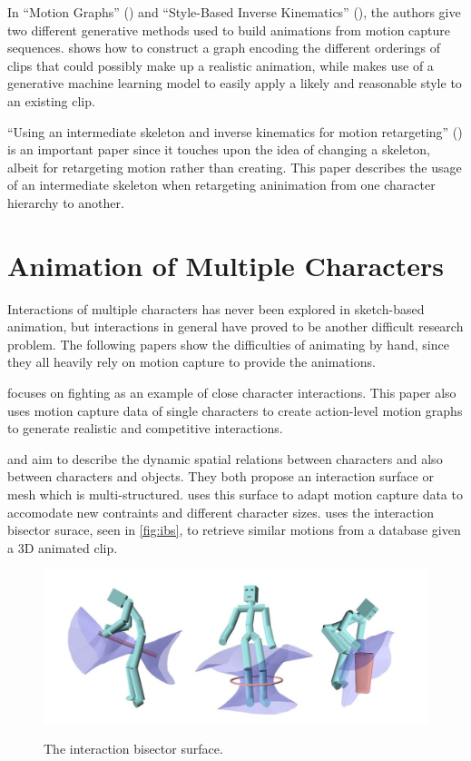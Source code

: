 In ``Motion Graphs'' (\citep{kovar2002motion}) and ``Style-Based Inverse Kinematics'' (\citep{grochow2004style}), the authors give two different generative methods used to build animations from motion capture sequences. \citep{kovar2002motion} shows how to construct a graph encoding the different orderings of clips that could possibly make up a realistic animation, while \citep{grochow2004style} makes use of a generative machine learning model to easily apply a likely and reasonable style to an existing clip.

``Using an intermediate skeleton and inverse kinematics for motion retargeting'' (\citep{monzani2000using}) is an important paper since it touches upon the idea of changing a skeleton, albeit for retargeting motion rather than creating. This paper describes the usage of an intermediate skeleton when retargeting aninimation from one character hierarchy to another.

\section{Animation of Multiple Characters}
Interactions of multiple characters has never been explored in sketch-based animation, but interactions in general have proved to be another difficult research problem. The following papers show the difficulties of animating by hand, since they all heavily rely on motion capture to provide the animations.

\citep{shum2007simulating} focuses on fighting as an example of close character interactions. This paper also uses motion capture data of single characters to create action-level motion graphs to generate realistic and competitive interactions.
  
\citep{ho2014multi} and \citep{zhao2017character} aim to describe the dynamic spatial relations between characters and also between characters and objects. They both propose an interaction surface or mesh which is multi-structured. \citep{ho2014multi} uses this surface to adapt motion capture data to accomodate new contraints and different character sizes. \citep{zhao2017character} uses the interaction bisector surace, seen in \autoref{fig:ibs}, to retrieve similar motions from a database given a 3D animated clip.

\begin{figure}[!h]
\centering
\includegraphics[scale=0.5]{img/ibs}
\label{fig:ibs}
\caption{The interaction bisector surface.}
\end{figure}


